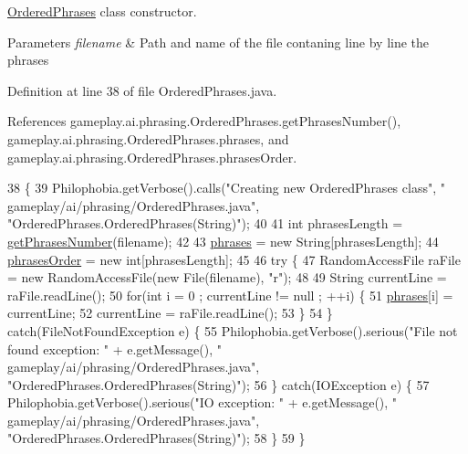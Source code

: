 \hyperlink{classgameplay_1_1ai_1_1phrasing_1_1_ordered_phrases}{Ordered\-Phrases} class constructor. 


\begin{DoxyParams}{Parameters}
{\em filename} & Path and name of the file contaning line by line the phrases \\
\hline
\end{DoxyParams}


Definition at line 38 of file Ordered\-Phrases.\-java.



References gameplay.\-ai.\-phrasing.\-Ordered\-Phrases.\-get\-Phrases\-Number(), gameplay.\-ai.\-phrasing.\-Ordered\-Phrases.\-phrases, and gameplay.\-ai.\-phrasing.\-Ordered\-Phrases.\-phrases\-Order.


\begin{DoxyCode}
38                                                  \{
39         Philophobia.getVerbose().calls(\textcolor{stringliteral}{"Creating new OrderedPhrases class"}, \textcolor{stringliteral}{"
      gameplay/ai/phrasing/OrderedPhrases.java"}, \textcolor{stringliteral}{"OrderedPhrases.OrderedPhrases(String)"});
40 
41         \textcolor{keywordtype}{int} phrasesLength = \hyperlink{classgameplay_1_1ai_1_1phrasing_1_1_ordered_phrases_a3e549baaecd87057c01a8effafcf0ada}{getPhrasesNumber}(filename);
42 
43         \hyperlink{classgameplay_1_1ai_1_1phrasing_1_1_ordered_phrases_ad31c26f17c9c223ae5a4260a77e60729}{phrases} = \textcolor{keyword}{new} String[phrasesLength];
44         \hyperlink{classgameplay_1_1ai_1_1phrasing_1_1_ordered_phrases_a8494c96fae41b483dc07c1d513da779e}{phrasesOrder} = \textcolor{keyword}{new} \textcolor{keywordtype}{int}[phrasesLength];
45 
46         \textcolor{keywordflow}{try} \{
47             RandomAccessFile raFile = \textcolor{keyword}{new} RandomAccessFile(\textcolor{keyword}{new} File(filename), \textcolor{stringliteral}{"r"});
48 
49             String currentLine = raFile.readLine();
50             \textcolor{keywordflow}{for}(\textcolor{keywordtype}{int} i = 0 ; currentLine != null ; ++i) \{
51                 \hyperlink{classgameplay_1_1ai_1_1phrasing_1_1_ordered_phrases_ad31c26f17c9c223ae5a4260a77e60729}{phrases}[i] = currentLine;
52                 currentLine = raFile.readLine();
53             \}
54         \} \textcolor{keywordflow}{catch}(FileNotFoundException e) \{
55             Philophobia.getVerbose().serious(\textcolor{stringliteral}{"File not found exception: "} + e.getMessage(), \textcolor{stringliteral}{"
      gameplay/ai/phrasing/OrderedPhrases.java"}, \textcolor{stringliteral}{"OrderedPhrases.OrderedPhrases(String)"});
56         \} \textcolor{keywordflow}{catch}(IOException e) \{
57             Philophobia.getVerbose().serious(\textcolor{stringliteral}{"IO exception: "} + e.getMessage(), \textcolor{stringliteral}{"
      gameplay/ai/phrasing/OrderedPhrases.java"}, \textcolor{stringliteral}{"OrderedPhrases.OrderedPhrases(String)"});
58         \}
59     \}
\end{DoxyCode}


